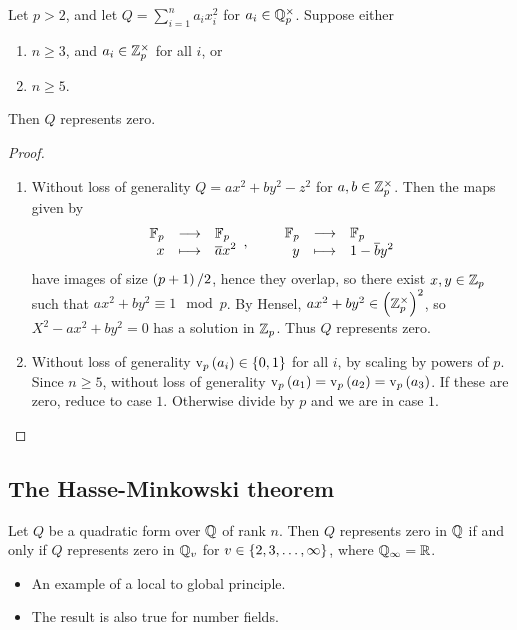\begin{proposition}
\label{prop:23.6}
Let $ p > 2 $, and let $ Q = \sum_{i = 1}^n a_ix_i^2 $ for $ a_i \in \mathbb{Q}_p^\times $. Suppose either
\begin{enumerate}
\item $ n \ge 3 $, and $ a_i \in \mathbb{Z}_p^\times $ for all $ i $, or
\item $ n \ge 5 $.
\end{enumerate}
Then $ Q $ represents zero.
\end{proposition}

\begin{proof}
\hfill
\begin{enumerate}
\item Without loss of generality $ Q = ax^2 + by^2 - z^2 $ for $ a, b \in \mathbb{Z}_p^\times $. Then the maps given by
$$ \function{\FF_p}{\FF_p}{x}{\overline{a}x^2}, \qquad \function{\FF_p}{\FF_p}{y}{1 - \overline{b}y^2} $$
have images of size $ \br{p + 1} / 2 $, hence they overlap, so there exist $ x, y \in \mathbb{Z}_p $ such that $ ax^2 + by^2 \equiv 1 \mod p $. By Hensel, $ ax^2 + by^2 \in \br{\ZZ_p^\times}^2 $, so $ X^2 - ax^2 + by^2 = 0 $ has a solution in $ \mathbb{Z}_p $. Thus $ Q $ represents zero.
\item Without loss of generality $ \v_p\br{a_i} \in \cbr{0, 1} $ for all $ i $, by scaling by powers of $ p $. Since $ n \ge 5 $, without loss of generality $ \v_p\br{a_1} = \v_p\br{a_2} = \v_p\br{a_3} $. If these are zero, reduce to case $ 1 $. Otherwise divide by $ p $ and we are in case $ 1 $.
\end{enumerate}
\end{proof}

\subsection{The Hasse-Minkowski theorem}


\begin{theorem}
\label{thm:24.1}
Let $ Q $ be a quadratic form over $ \mathbb{Q} $ of rank $ n $. Then $ Q $ represents zero in $ \mathbb{Q} $ if and only if $ Q $ represents zero in $ \mathbb{Q}_v $ for $ v \in \cbr{2, 3, \dots, \infty} $, where $ \mathbb{Q}_\infty = \mathbb{R} $.
\end{theorem}

\begin{remark*}
\hfill
\begin{itemize}
\item An example of a local to global principle.
\item The result is also true for number fields.
\end{itemize}
\end{remark*}

